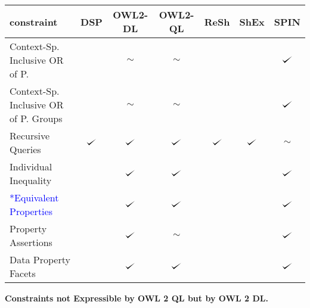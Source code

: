 \documentclass{llncs}
\def\checkmark{\tikz\fill[scale=0.4](0,.35) -- (.25,0) -- (1,.7) -- (.25,.15) -- cycle;}
\newenvironment{evaluation}{
  \scriptsize
  \sffamily
  \vspace{0.3cm}
  \begin{tabular}{l|c|c|c|c|c|c}
  \hline
  \textbf{constraint} & \textbf{DSP} & \textbf{OWL2-DL} & \textbf{OWL2-QL} & \textbf{ReSh} & \textbf{ShEx} & \textbf{SPIN} \\
  \hline

}{
  \hline
  \end{tabular}
  \linebreak
}
\begin{document}
\begin{evaluation}
Context-Sp. Inclusive OR of P. & \ding{55} & $\sim$ & $\sim$ & & \ding{55} & $\checkmark$ \\
Context-Sp. Inclusive OR of P. Groups & \ding{55} & $\sim$ & $\sim$ & & \ding{55} & $\checkmark$ \\
Recursive Queries & $\checkmark$ & $\checkmark$ & $\checkmark$ & $\checkmark$ & $\checkmark$ & $\sim$ \\
Individual Inequality & \ding{55} & $\checkmark$ & $\checkmark$ & \ding{55} & \ding{55} & $\checkmark$ \\
\textcolor{blue}{*Equivalent Properties} & \ding{55} & $\checkmark$ & $\checkmark$ & \ding{55} & \ding{55} & $\checkmark$ \\
Property Assertions & \ding{55} & $\checkmark$ & $\sim$ & \ding{55} & \ding{55} & $\checkmark$ \\
Data Property Facets & \ding{55} & $\checkmark$ & $\checkmark$ & \ding{55} & \ding{55} & $\checkmark$ \\
\end{evaluation}

\textbf{Constraints not Expressible by OWL 2 QL but by OWL 2 DL.}
\end{document}
